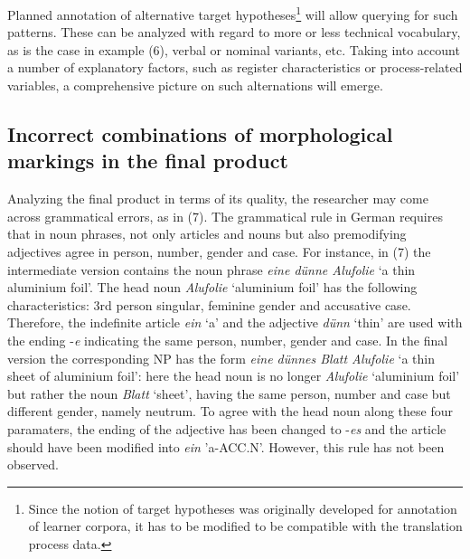 \documentclass[output=paper]{LSP/langsci}
\begin{document}

Planned annotation of alternative target hypotheses\footnote{Since the notion of target hypotheses was originally developed for annotation of learner corpora, it has to be modified to be compatible with the translation process data.}  will allow querying for such patterns. These can be analyzed with regard to more or less technical vocabulary, as is the case in example (6), verbal or nominal variants, etc. Taking into account a number of explanatory factors, such as register characteristics or process-related variables, a comprehensive picture on such alternations will emerge. 

\subsection{Incorrect combinations of morphological markings in the final product}
Analyzing the final product in terms of its quality, the researcher may come across grammatical errors, as in (7). The grammatical rule in German requires that in noun phrases, not only articles and nouns but also premodifying adjectives agree in person, number, gender and case. For instance, in (7) the intermediate version contains the noun phrase \textit{eine dünne Alufolie} ‘a thin aluminium foil'. The head noun \textit{Alufolie} ‘aluminium foil' has the following characteristics: 3rd person singular, feminine gender and accusative case. Therefore, the indefinite article \textit{ein} ‘a' and the adjective \textit{dünn} ‘thin' are used with the ending -\textit{e} indicating the same person, number, gender and case. In the final version the corresponding NP has the form \textit{eine dünnes Blatt Alufolie} ‘a thin sheet of aluminium foil': here the head noun is no longer \textit{Alufolie} ‘aluminium foil' but rather the noun \textit{Blatt} ‘sheet', having the same person, number and case but different gender, namely neutrum. To agree with the head noun along these four paramaters, the ending of the adjective has been changed to -\textit{es} and the article should have been modified into \textit{ein} 'a-ACC.N'. However, this rule has not been observed.
\end{document}
